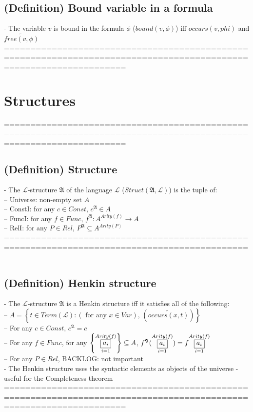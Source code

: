 \documentclass{book}
\newcommand{\pnot}[1]{\widetilde{#1}}
\newcommand{\txtforall}[2]{\left(\text{ for any }#1\right)\text{, }\left(#2\right)}
\newcommand{\occurs}[2]{occurs(#1, #2)}
\newcommand{\free}[2]{free(#1, #2)}
\newcommand{\means}[2]{#1^{#2}}
\newcommand{\set}[1]{\left\{ #1 \right\}}
\newcommand{\vdc}[3]{\underset{#2}{\overset{#3}{\fbox{$#1$}}}}
\newcommand{\bound}[2]{bound(#1, #2)}
\begin{document}
\subsection{(Definition) Bound variable in a formula} %
	- The variable $v$ is bound in the formula $\phi$ ($\bound{v}{\phi}$) iff $\occurs{v}{phi}$ and $\pnot{\free{v}{\phi}}$ \\
	===================================================================================================================

\section{Structures}
	===================================================================================================================
\subsection{(Definition) Structure} %
	- The $\mathcal{L}$-structure $\mathfrak{A}$ of the language $\mathcal{L}$ ($Struct(\mathfrak{A}, \mathcal{L})$) is the tuple of: \\
		-- Universe: non-empty set $A$ \\
		-- ConstI: for any $c \in Const$, $\means{c}{\mathfrak{A}} \in A$ \\
		-- FuncI: for any $f \in Func$, $\means{f}{\mathfrak{A}}: A^{Arity(f)} \rightarrow A$ \\
		-- RelI: for any $P \in Rel$, $\means{P}{\mathfrak{A}} \subseteq A^{Arity(P)}$ \\
	===================================================================================================================
\subsection{(Definition) Henkin structure} %
	- The $\mathcal{L}$-structure $\mathfrak{A}$ is a Henkin structure iff it satisfies all of the following: \\
		-- $A = \set{t \in Term(\mathcal{L}): \txtforall{x \in Var}{\pnot{\occurs{x}{t}}}}$ \\
		-- For any $c \in Const$, $\means{c}{\mathfrak{A}} = c$ \\
		-- For any $f \in Func$, for any $\set{\vdc{a_i}{i=1}{Arity(f)}} \subseteq A$, $\means{f}{\mathfrak{A}}(\vdc{a_i}{i=1}{Arity(f)}) = f \vdc{a_i}{i=1}{Arity(f)}$ \\
		-- For any $P \in Rel$, BACKLOG: not important \\
	- The Henkin structure uses the syntactic elements as objects of the universe - useful for the Completeness theorem \\
	===================================================================================================================
\end{document}

